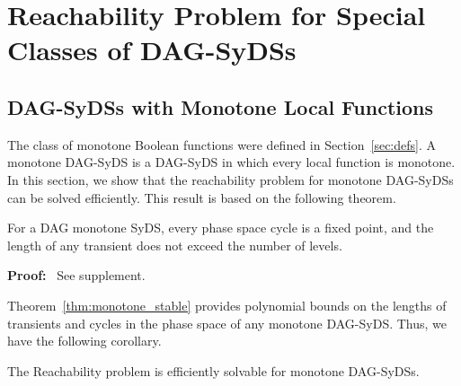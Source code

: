 \section{Reachability Problem for Special Classes of DAG-SyDSs}
\label{sec:reach_special}

\subsection{DAG-SyDSs with Monotone Local Functions}
\label{sse:monotoner_functions}

The class of monotone Boolean functions were defined in
Section~\ref{sec:defs}.
A monotone DAG-SyDS is a DAG-SyDS in which every local
function is monotone.
In this section, we show that the reachability problem
for monotone DAG-SyDSs can be solved efficiently.
This result is based on the following theorem. 

\begin{theorem}\label{thm:monotone_stable}
For a DAG monotone SyDS, every phase space cycle is a fixed point, 
and the length of any transient does not exceed the number of levels.
\end{theorem}

\noindent
\textbf{Proof:}~ See supplement.

\iffalse
\noindent
\textbf{Proof:}~ 
By induction on the number of levels for each level $i$, 
each level $i$ node is stable after at most $i$ steps.

From Lemma \ref{lem:level_zero_nodes}, every level 0 node is either
stable or alternating  at time 1.  The complement function is not
monotone, so a  level 0 node is cannot be alternating, and thus is
stable at time 1.

Suppose that all the incoming edges to a given node $v$ have stable
values at time $t$.  From Lemma \ref{lem:all_inputs_stable}, node
$v$ is either stable or alternating  at time $t+1$.  Since the local
transition function for node $v$ is monotone, and all the incoming
edges have stable values at time $t$, node $v$ is stable at time
$t+1$. \QED

We observe that that for every $L \geq 0$, there exists a DAG
monotone SyDS with a transient of length $L$.  Consider the SyDS
whose underlying graph is a directed chain of $L$ nodes.  The local
transition function of the level 0 node is the constant 1, and of
every other node is the {\em or} of its value and the value from
the incoming edge.  The configuration of all zeros takes $L$ steps
to reach the fixed point of all ones.
\fi

\smallskip

Theorem~\ref{thm:monotone_stable} provides polynomial bounds
on the lengths of transients and cycles in the phase space of any
monotone DAG-SyDS. Thus, we have the following corollary.

\begin{corollary}\label{cor:poly_monotone_dag_syds}
The Reachability problem is efficiently solvable for monotone
DAG-SyDSs.
\end{corollary}

